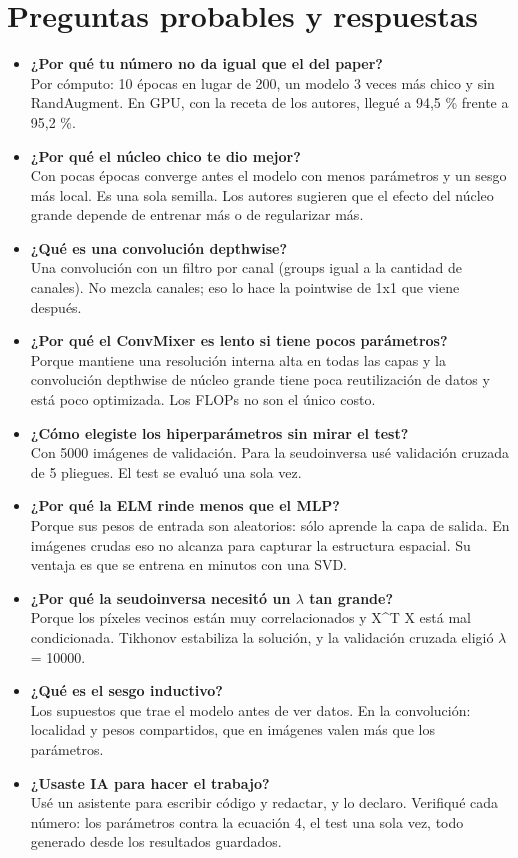 \documentclass[11pt,a4paper]{article}
\begin{document}
\section{Preguntas probables y respuestas}
\begin{itemize}[leftmargin=1.2em]
\item \textbf{¿Por qué tu número no da igual que el del paper?}\\ Por cómputo: 10 épocas en lugar de 200, un modelo 3 veces más chico y sin RandAugment. En GPU, con la receta de los autores, llegué a 94,5 \% frente a 95,2 \%.
\item \textbf{¿Por qué el núcleo chico te dio mejor?}\\ Con pocas épocas converge antes el modelo con menos parámetros y un sesgo más local. Es una sola semilla. Los autores sugieren que el efecto del núcleo grande depende de entrenar más o de regularizar más.
\item \textbf{¿Qué es una convolución depthwise?}\\ Una convolución con un filtro por canal (groups igual a la cantidad de canales). No mezcla canales; eso lo hace la pointwise de 1x1 que viene después.
\item \textbf{¿Por qué el ConvMixer es lento si tiene pocos parámetros?}\\ Porque mantiene una resolución interna alta en todas las capas y la convolución depthwise de núcleo grande tiene poca reutilización de datos y está poco optimizada. Los FLOPs no son el único costo.
\item \textbf{¿Cómo elegiste los hiperparámetros sin mirar el test?}\\ Con 5000 imágenes de validación. Para la seudoinversa usé validación cruzada de 5 pliegues. El test se evaluó una sola vez.
\item \textbf{¿Por qué la ELM rinde menos que el MLP?}\\ Porque sus pesos de entrada son aleatorios: sólo aprende la capa de salida. En imágenes crudas eso no alcanza para capturar la estructura espacial. Su ventaja es que se entrena en minutos con una SVD.
\item \textbf{¿Por qué la seudoinversa necesitó un $\lambda$ tan grande?}\\ Porque los píxeles vecinos están muy correlacionados y X\^{}T X está mal condicionada. Tikhonov estabiliza la solución, y la validación cruzada eligió $\lambda$ = 10000.
\item \textbf{¿Qué es el sesgo inductivo?}\\ Los supuestos que trae el modelo antes de ver datos. En la convolución: localidad y pesos compartidos, que en imágenes valen más que los parámetros.
\item \textbf{¿Usaste IA para hacer el trabajo?}\\ Usé un asistente para escribir código y redactar, y lo declaro. Verifiqué cada número: los parámetros contra la ecuación 4, el test una sola vez, todo generado desde los resultados guardados.
\end{itemize}
\end{document}
